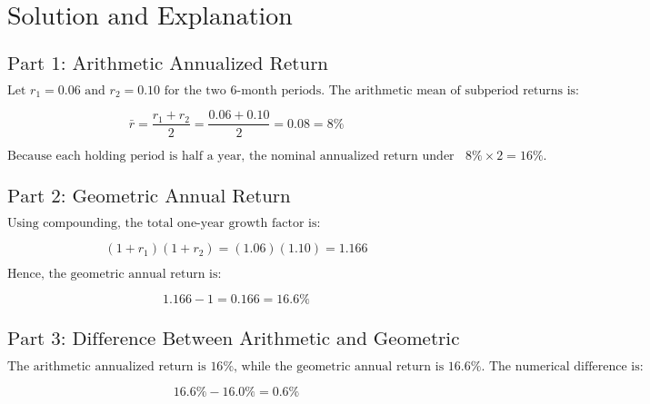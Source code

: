 \section*{\(\text{Solution and Explanation}\)}

\subsection*{\(\text{Part 1: Arithmetic Annualized Return}\)}
\(\text{Let } r_{1}=0.06 \text{ and } r_{2}=0.10 \text{ for the two 6-month periods. The arithmetic mean of subperiod returns is:}\)

\[
\bar{r} 
=
\frac{r_{1}+r_{2}}{2}
=
\frac{0.06 + 0.10}{2}
=
0.08
=
8\%
\]

\(\text{Because each holding period is half a year, the nominal annualized return under the arithmetic approach is } 8\%\times 2=16\%. \)

\subsection*{\(\text{Part 2: Geometric Annual Return}\)}
\(\text{Using compounding, the total one-year growth factor is:}\)

\[
(1 + r_{1})(1 + r_{2}) = (1.06)(1.10) = 1.166
\]

\(\text{Hence, the geometric annual return is:}\)

\[
1.166 - 1 = 0.166 = 16.6\%
\]

\subsection*{\(\text{Part 3: Difference Between Arithmetic and Geometric}\)}
\(\text{The arithmetic annualized return is }16\%\text{, while the geometric annual return is }16.6\%\text{. The numerical difference is:}\)

\[
16.6\% - 16.0\% = 0.6\%
\]

